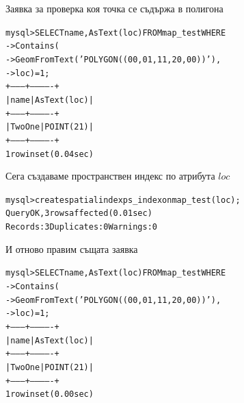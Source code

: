 \documentclass{beamer}
\begin{document}
\begin{frame}[fragile]
\begin{beamerboxesrounded}{Заявка за проверка коя точка се съдържа в полигона}
\begin{alltt}
mysql> SELECT name, AsText(loc) FROM map_test WHERE
    -> Contains(
    -> GeomFromText('POLYGON((0 0, 0 1, 1 1, 2 0, 0 0))'),
    -> loc) = 1;
+---------+-------------+
| name    | AsText(loc) |
+---------+-------------+
| Two One | POINT(2 1)  |
+---------+-------------+
\alert{1 row in set (0.04 sec)}
\end{alltt}
\end{beamerboxesrounded}
\end{frame}

\begin{frame}[fragile]
\begin{beamerboxesrounded}{Сега създаваме пространствен индекс по атрибута $loc$}
\begin{alltt}
mysql> create spatial index ps_index on map_test(loc);
Query OK, 3 rows affected (0.01 sec)
Records: 3  Duplicates: 0  Warnings: 0
\end{alltt}
\end{beamerboxesrounded}
\end{frame}

\begin{frame}[fragile]
\begin{beamerboxesrounded}{И отново правим същата заявка}
\begin{alltt}
mysql>  SELECT name, AsText(loc) FROM map_test WHERE
    ->  Contains(
    ->  GeomFromText('POLYGON((0 0, 0 1, 1 1, 2 0, 0 0))'),
    ->  loc) = 1;
+---------+-------------+
| name    | AsText(loc) |
+---------+-------------+
| Two One | POINT(2 1)  |
+---------+-------------+
\alert{1 row in set (0.00 sec)}
\end{alltt}
\end{beamerboxesrounded}
\end{frame}
\end{document}
